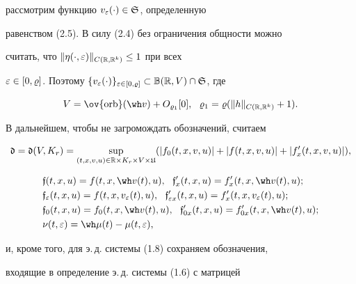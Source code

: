 рассмотрим функцию $v_{\varepsilon}(\cdot)\in\frak S$, определенную


равенством (2.5). В силу (2.4) без ограничения общности можно


считать, что $\|\eta(\cdot,\varepsilon)\|_{C(\Bbb R,\Bbb R^k)}\le1$ при всех


$\ve\in[0,\vr]$. Поэтому $\{v_{\ve}(\cdot)\}_{\ve\in[0,\vr]}\subset


\Bbb B(\R,V)\cap\gS$, где


\begin{equation}


V=\ov{\orb}(\wh v)+O_{\vr_1}[0],\ \ \vr_1=\vr(\|h\|_{C(\R,\R^k)}+1).


\end{equation}


В дальнейшем, чтобы не загромождать обозначений, считаем


\begin{equation}


\gd=\gd(V,K_r)=\sup\lt_{(t,x,v,u)\in\R\times K_r\times V\times \gU}


(|f_0(t,x,v,u)|+|f(t,x,v,u)|+|f'_x(t,x,v,u)|),


\end{equation}


\begin{equation}


\begin{split}


&\frak{f}(t,x,u)= f(t,x,\wh v(t),u),


\ \ {\frak{f}}_x'(t,x,u)= f_x'(t,x,\wh v(t),u); \\


&\frak{f}_{\ve}(t,x,u)= f(t,x,v_{\ve}(t),u),


\ \ \frak{f}_{\ve x}'(t,x,u)=f_x'(t,x,v_{\ve}(t),u); \\


& \frak{f}_{0}(t,x,u)= f_{0}(t,x,\wh v(t),u),


\ \ {\frak{f}}_{0x}'(t,x,u)= f_{0x}'(t,x,\wh v(t),u); \\


&\nu(t,\ve)=\wh\mu(t)-\mu(t,\ve),


\end{split}


\end{equation}


и, кроме того, для э.\,д. системы (1.8) сохраняем обозначения,


входящие в определение э.\,д. системы (1.6) с матрицей


